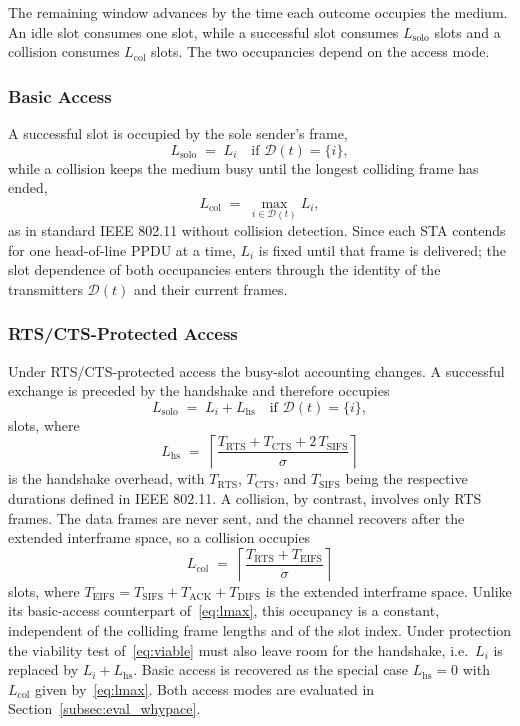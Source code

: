 \documentclass[conference]{IEEEtran}
\begin{document}
The remaining window advances by the time each outcome occupies the medium. An idle slot consumes one slot, while a successful slot consumes $L_\mathrm{solo}$ slots and a collision consumes $L_\mathrm{col}$ slots. The two occupancies depend on the access mode.

\subsubsection{Basic Access}
A successful slot is occupied by the sole sender's frame,
\begin{equation}
    L_\mathrm{solo} \;=\; L_i \quad \text{if } \mathcal{D}(t)=\{i\},
    \label{eq:lsolo_basic}
\end{equation}
while a collision keeps the medium busy until the longest colliding frame has ended,
\begin{equation}
    L_\mathrm{col} \;=\; \max_{i\in\mathcal{D}(t)} L_i,
    \label{eq:lmax}
\end{equation}
as in standard IEEE 802.11 without collision detection. Since each STA contends for one head-of-line PPDU at a time, $L_i$ is fixed until that frame is delivered; the slot dependence of both occupancies enters through the identity of the transmitters $\mathcal{D}(t)$ and their current frames.

\subsubsection{RTS/CTS-Protected Access}
Under RTS/CTS-protected access the busy-slot accounting changes. A successful exchange is preceded by the handshake and therefore occupies
\begin{equation}
    L_\mathrm{solo} \;=\; L_i + L_\mathrm{hs} \quad \text{if } \mathcal{D}(t)=\{i\},
    \label{eq:lsolo_rts}
\end{equation}
slots, where
\begin{equation}
    L_\mathrm{hs} \;=\; \left\lceil
    \frac{T_\mathrm{RTS} + T_\mathrm{CTS} + 2\,T_\mathrm{SIFS}}{\sigma}
    \right\rceil
    \label{eq:oh_rts}
\end{equation}
is the handshake overhead, with $T_\mathrm{RTS}$, $T_\mathrm{CTS}$, and $T_\mathrm{SIFS}$ being the respective durations defined in IEEE 802.11. A collision, by contrast, involves only RTS frames. The data frames are never sent, and the channel recovers after the extended interframe space, so a collision occupies
\begin{equation}
    L_\mathrm{col} \;=\; \left\lceil
    \frac{T_\mathrm{RTS} + T_\mathrm{EIFS}}{\sigma} \right\rceil
    \label{eq:coll_rts}
\end{equation}
slots, where $T_\mathrm{EIFS}=T_\mathrm{SIFS}+T_\mathrm{ACK}+T_\mathrm{DIFS}$ is the extended interframe space. Unlike its basic-access counterpart of~\eqref{eq:lmax}, this occupancy is a constant, independent of the colliding frame lengths and of the slot index. Under protection the viability test of~\eqref{eq:viable} must also leave room for the handshake, i.e.\ $L_i$ is replaced by $L_i+L_\mathrm{hs}$. Basic access is recovered as the special case $L_\mathrm{hs}=0$ with $L_\mathrm{col}$ given by~\eqref{eq:lmax}. Both access modes are evaluated in Section~\ref{subsec:eval_whypace}.
\end{document}
